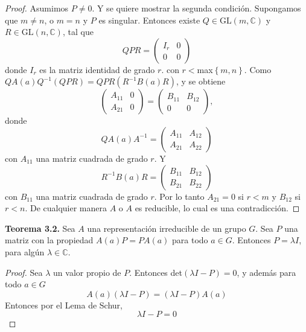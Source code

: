 \documentclass[12pt]{book}
\theoremstyle{definition}
\newcounter{in}
\begin{document}
\begin{proof}
Asumimos $P \neq 0$. Y se quiere mostrar la segunda
condición. Supongamos que $m \neq n$, o $m=n$ y $P$ es
singular. Entonces existe $Q \in \mathrm{GL}(m,\mathbb{C})$ y
$R \in \mathrm{GL}(n,\mathbb{C})$, tal que
\begin{equation*}
  QPR=
  \begin{pmatrix}
    I_{r} & 0 \\ 
    0 & 0
  \end{pmatrix} 
\end{equation*}
donde $I_{r}$ es la matriz identidad de grado $r$. con
$r<$max$\left\{ m,n \right\}$. Como
$QA(a)Q^{-1}(QPR) = QPR(R^{-1}B(a)R)$, y se obtiene
\begin{equation*}
  \begin{pmatrix}
    A_{11} & 0 \\ 
    A_{21} & 0
  \end{pmatrix}
  =
  \begin{pmatrix}
    B_{11} & B_{12} \\ 
    0 & 0
  \end{pmatrix},
\end{equation*}
donde
\begin{equation*}
  QA(a)A^{-1}=
  \begin{pmatrix}
    A_{11} & A_{12} \\ 
    A_{21} & A_{22}
  \end{pmatrix} 
\end{equation*}  
con $A_{11}$ una matriz cuadrada de grado $r$. Y
\begin{equation*}
  R^{-1}B(a)R=
  \begin{pmatrix}
    B_{11} & B_{12} \\ 
    B_{21} & B_{22}
  \end{pmatrix}
\end{equation*}
con $B_{11}$ una matriz cuadrada de grado $r$. Por lo tanto
$A_{21}=0$ si $r<m$ y $B_{12}$ si $r<n$. De cualquier manera
$A$ o $A$ es reducible, lo cual es una
contradicción.
\end{proof}

\textbf{Teorema 3.2.} Sea $A$ una representación irreducible de un
grupo $G$. Sea $P$ una matriz con la propiedad $A(a)P=PA(a)$ para todo
$a \in G$. Entonces $P=\lambda I$, para algún
$\lambda \in \mathbb{C}$.
\begin{proof}
  Sea $\lambda$ un valor propio de $P$. Entonces
  det$(\lambda I - P)=0$, y además para todo $a \in G$
  \begin{equation*}
    A(a)(\lambda I - P)=(\lambda I - P)A(a)
  \end{equation*}
  Entonces por el Lema de Schur,
  \begin{equation*}
    \lambda I-P=0
  \end{equation*}
\end{proof}
\end{document}
